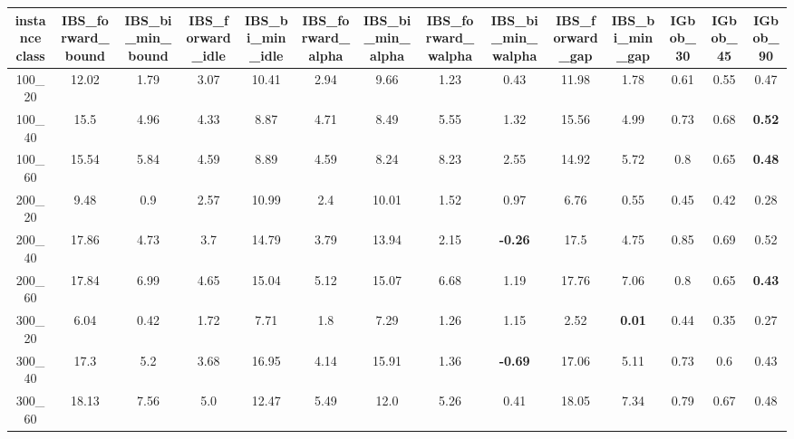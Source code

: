 \begin{tabular}{c|ccccccccccccc}
instance class & IBS\_forward\_bound & IBS\_bi\_min\_bound & IBS\_forward\_idle & IBS\_bi\_min\_idle & IBS\_forward\_alpha & IBS\_bi\_min\_alpha & IBS\_forward\_walpha & IBS\_bi\_min\_walpha & IBS\_forward\_gap & IBS\_bi\_min\_gap & IGbob\_30 & IGbob\_45 & IGbob\_90 \\ 
\hline
100\_20      & 12.02        & 1.79         & 3.07         & 10.41        & 2.94         & 9.66         & 1.23         & 0.43         & 11.98        & 1.78         & 0.61         & 0.55         & 0.47         \\ 
100\_40      & 15.5         & 4.96         & 4.33         & 8.87         & 4.71         & 8.49         & 5.55         & 1.32         & 15.56        & 4.99         & 0.73         & 0.68         & {\bf 0.52}   \\ 
100\_60      & 15.54        & 5.84         & 4.59         & 8.89         & 4.59         & 8.24         & 8.23         & 2.55         & 14.92        & 5.72         & 0.8          & 0.65         & {\bf 0.48}   \\ 
200\_20      & 9.48         & 0.9          & 2.57         & 10.99        & 2.4          & 10.01        & 1.52         & 0.97         & 6.76         & 0.55         & 0.45         & 0.42         & 0.28         \\ 
200\_40      & 17.86        & 4.73         & 3.7          & 14.79        & 3.79         & 13.94        & 2.15         & {\bf -0.26}  & 17.5         & 4.75         & 0.85         & 0.69         & 0.52         \\ 
200\_60      & 17.84        & 6.99         & 4.65         & 15.04        & 5.12         & 15.07        & 6.68         & 1.19         & 17.76        & 7.06         & 0.8          & 0.65         & {\bf 0.43}   \\ 
300\_20      & 6.04         & 0.42         & 1.72         & 7.71         & 1.8          & 7.29         & 1.26         & 1.15         & 2.52         & {\bf 0.01}   & 0.44         & 0.35         & 0.27         \\ 
300\_40      & 17.3         & 5.2          & 3.68         & 16.95        & 4.14         & 15.91        & 1.36         & {\bf -0.69}  & 17.06        & 5.11         & 0.73         & 0.6          & 0.43         \\ 
300\_60      & 18.13        & 7.56         & 5.0          & 12.47        & 5.49         & 12.0         & 5.26         & 0.41         & 18.05        & 7.34         & 0.79         & 0.67         & 0.48         \\ 

\end{tabular}
